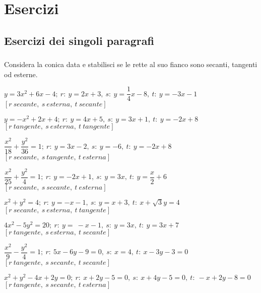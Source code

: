 
\section{Esercizi}

\subsection{Esercizi dei singoli paragrafi}

\subsubsection*{}

\begin{esercizio}
  \label{ese:div.003}
  Considera la conica data e stabilisci se le rette al suo fianco 
sono secanti, tangenti od esterne.
  \begin{enumeratea}

\item $y=3 x^{2} +6x-4;~r:~y=2x+3,~s:~y=\dfrac{1}{4}x-8,~t:~y=-3x-1$\\ 
\hfill  $\left[r~secante,~s ~esterna,~ t~secante\right]$
\item $y=-x^{2}+2x+4;~r:~y=4x+5,~s:~y=3x+1,~t:~y=-2x+8$\\
\hfill $\left[r~tangente,~s~esterna,~t~tangente\right]$
\item $\dfrac{x^{2}}{18} 
+\dfrac{y^{2}}{36}=1;~r:~y=3x-2,~s:~y=-6,~t:~y=-2x+8$\\
\hfill $\left[r~secante,~s~tangente,~t~esterna\right]$
\item $\dfrac{x^{2}}{25}+\dfrac{y^{2}}{4}=1;~r:~y=-2x+1,~s:~y=3x,~t:~y= 
\dfrac{x}{2} +6$\\
\hfill $\left[r~secante,~s~secante,~t~esterna\right]$
\item $ x^{2}+y^{2}=4;~r:~y=-x-1,~s:~y=x+3,~t:~x+\sqrt{3}y=4$\\
\hfill $\left[r~secante,~s~esterna,~t~tangente\right]$
\item $4 x^{2}-5 y^{2}=20;~r:~y=~-x-1,~s:~y=3x,~t:~y=3x+7$\\
\hfill $\left[r~tangente,~s~esterna,~t~secante\right]$
\item $\dfrac{x^{2}}{9}-\dfrac{y^{2}}{4}=1;~r:~5x-6y-9=0,~s:~x=4,~t:~ 
x-3y-3=0$\\
\hfill $\left[r~tangente,~s~secante,~t~secante\right]$
\item $x^{2}+y^{2}-4x+2y=0;~r:~x+2y-5=0,~s:~x+4y-5=0,~t:~-x+2y-8=0$\\
\hfill $\left[r~tangente,~s~secante,~t~esterna\right]$
\end{enumeratea}
\end{esercizio}

